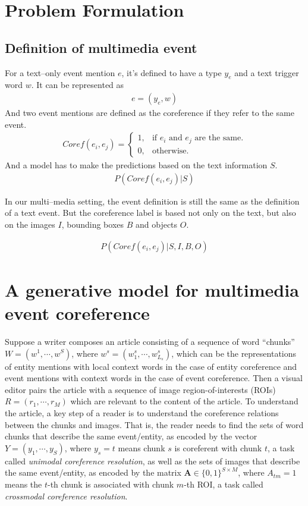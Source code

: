 \documentclass[11pt,a4paper]{article}
\newcommand{\bA}{\mathbf{A}}
\begin{document}
\section{Problem Formulation}
\subsection{Definition of multimedia event}
For a text--only event mention $e$, it's defined to have a type $y_e$ and a text trigger word $w$. It can be represented as 
\begin{align*}
    e = (y_e, w)
\end{align*}
And two event mentions are defined as the coreference if they refer to the same event. 
\begin{align*}
    Coref(e_i,e_j)= \begin{cases}
    1, & \text{if $e_i$ and $e_j$ are the same}.\\
    0, & \text{otherwise}.
    \end{cases}
\end{align*}    
And a model has to make the predictions based on the text information $S$.
\begin{align*}
    P(Coref(e_i,e_j)|S)
\end{align*}

In our multi--media setting, the event definition is still the same as the definition of a text event. But the coreference label is based not only on the text, but also on the images $I$, bounding boxes $B$ and objects $O$. 

\begin{align*}
    P(Coref(e_i,e_j)|S,I,B,O)
\end{align*}

\section{A generative model for multimedia event coreference}
 Suppose a writer composes an article consisting of a sequence of word ``chunks'' $W = (w^1, \cdots, w^S)$, where $w^s = (w^s_1, \cdots, w^s_{L_s})$, which can be the representations of entity mentions with local context words in the case of entity coreference and event mentions with context words in the case of event coreference. Then a visual editor pairs the article with a sequence of image region-of-interests (ROIs) $R = (r_1, \cdots, r_M)$ which are relevant to the content of the article. To understand the article, a key step of a reader is to understand the coreference relations between the chunks and images. That is, the reader needs to find the sets of word chunks that describe the same event/entity, as encoded by the vector $Y = (y_1,\cdots,y_S)$, where $y_s = t$ means chunk $s$ is coreferent with chunk $t$, a task called \textit{unimodal coreference resolution}, as well as the sets of images that describe the same event/entity, as encoded by the matrix $\bA \in \{0, 1\}^{S \times M}$, where $A_{tm}=1$ means the $t$-th chunk is associated with chunk $m$-th ROI, a task called \textit{crossmodal coreference resolution}.  
 
\end{document}
